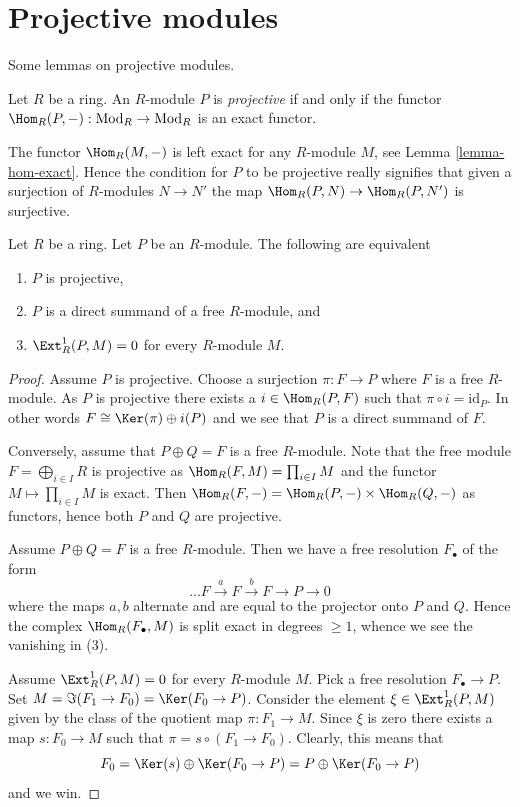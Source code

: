 \section{Projective modules}
\label{section-projective}

\noindent
Some lemmas on projective modules.

\begin{definition}
\label{definition-projective}
Let $R$ be a ring. An $R$-module $P$ is {\it projective} if and only if
the functor $\Hom_R(P, -) : \text{Mod}_R \to \text{Mod}_R$ is
an exact functor.
\end{definition}

\noindent
The functor $\Hom_R(M, - )$ is left exact for any $R$-module $M$, see
Lemma \ref{lemma-hom-exact}.
Hence the condition for $P$ to be projective really signifies that given
a surjection of $R$-modules $N \to N'$ the map
$\Hom_R(P, N) \to \Hom_R(P, N')$ is surjective.

\begin{lemma}
\label{lemma-characterize-projective}
Let $R$ be a ring. Let $P$ be an $R$-module.
The following are equivalent
\begin{enumerate}
\item $P$ is projective,
\item $P$ is a direct summand of a free $R$-module, and
\item $\Ext^1_R(P, M) = 0$ for every $R$-module $M$.
\end{enumerate}
\end{lemma}

\begin{proof}
Assume $P$ is projective. Choose a surjection $\pi : F \to P$ where $F$
is a free $R$-module. As $P$ is projective there exists a
$i \in \Hom_R(P, F)$ such that $\pi \circ i = \text{id}_P$.
In other words $F \cong \Ker(\pi) \oplus i(P)$ and we see
that $P$ is a direct summand of $F$.

\medskip\noindent
Conversely, assume that $P \oplus Q = F$ is a free $R$-module.
Note that the free module $F = \bigoplus_{i \in I} R$ is projective
as $\Hom_R(F, M) = \prod_{i \in I} M$ and the functor
$M \mapsto \prod_{i \in I} M$ is exact.
Then $\Hom_R(F, -) = \Hom_R(P, -) \times \Hom_R(Q, -)$
as functors, hence both $P$ and $Q$ are projective.

\medskip\noindent
Assume $P \oplus Q = F$ is a free $R$-module. Then we have a
free resolution $F_\bullet$ of the form
$$
\ldots F \xrightarrow{a} F \xrightarrow{b} F \to P \to 0
$$
where the maps $a, b$ alternate and are equal to the projector onto
$P$ and $Q$. Hence the complex $\Hom_R(F_\bullet, M)$ is split
exact in degrees $\geq 1$, whence we see the vanishing in (3).

\medskip\noindent
Assume $\Ext^1_R(P, M) = 0$ for every $R$-module $M$.
Pick a free resolution $F_\bullet \to P$. Set
$M = \Im(F_1 \to F_0) = \Ker(F_0 \to P)$.
Consider the element $\xi \in \Ext^1_R(P, M)$ given by
the class of the quotient map $\pi : F_1 \to M$. Since $\xi$ is zero
there exists a map $s : F_0 \to M$ such that $\pi = s \circ (F_1 \to F_0)$.
Clearly, this means that
$$
F_0 = \Ker(s) \oplus \Ker(F_0 \to P) =
P \oplus \Ker(F_0 \to P)
$$
and we win.
\end{proof}

